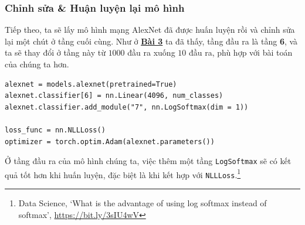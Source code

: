\documentclass[a4paper]{article}
\begin{document}
\subsubsection{Chỉnh sửa \& Huận luyện lại mô hình}
Tiếp theo, ta sẽ lấy mô hình mạng AlexNet đã được huấn luyện rồi và chỉnh sửa lại một chút ở tầng cuối cùng. Như ở \hyperref[bai3]{\textbf{Bài 3}} ta đã thấy, tầng đầu ra là tầng \textbf{6}, và ta sẽ thay đổi ở tầng này từ $1000$ đầu ra xuống $10$ đầu ra, phù hợp với bài toán của chúng ta hơn.
\begin{lstlisting}
alexnet = models.alexnet(pretrained=True)
alexnet.classifier[6] = nn.Linear(4096, num_classes)
alexnet.classifier.add_module("7", nn.LogSoftmax(dim = 1))

loss_func = nn.NLLLoss()
optimizer = torch.optim.Adam(alexnet.parameters())
\end{lstlisting}
Ở tầng đầu ra của mô hình chúng ta, việc thêm một tầng \texttt{LogSoftmax} sẽ có kết quả tốt hơn khi huấn luyện, đặc biệt là khi kết hợp với \texttt{NLLLoss}.\footnote{Data Science, \lq What is the advantage of using log softmax instead of softmax\rq, \href{https://bit.ly/3sIU4wV}{https://bit.ly/3sIU4wV}}
\end{document}

